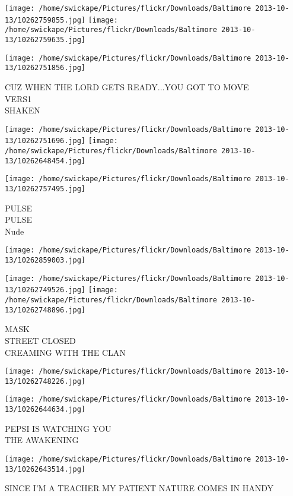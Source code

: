 \documentclass[10pt,letterpaper]{article}
\begin{document}
\texttt{[image: /home/swickape/Pictures/flickr/Downloads/Baltimore 2013-10-13/10262759855.jpg]}
\texttt{[image: /home/swickape/Pictures/flickr/Downloads/Baltimore 2013-10-13/10262759635.jpg]}

\vspace{0.25in}
\texttt{[image: /home/swickape/Pictures/flickr/Downloads/Baltimore 2013-10-13/10262751856.jpg]}

CUZ WHEN THE LORD GETS READY...YOU GOT TO MOVE\\
VERS1\\
SHAKEN\\
\pagebreak

\texttt{[image: /home/swickape/Pictures/flickr/Downloads/Baltimore 2013-10-13/10262751696.jpg]}
\texttt{[image: /home/swickape/Pictures/flickr/Downloads/Baltimore 2013-10-13/10262648454.jpg]}

\vspace{0.25in}
\texttt{[image: /home/swickape/Pictures/flickr/Downloads/Baltimore 2013-10-13/10262757495.jpg]}

PULSE\\
PULSE\\
Nude\\
\pagebreak

\texttt{[image: /home/swickape/Pictures/flickr/Downloads/Baltimore 2013-10-13/10262859003.jpg]}

\vspace{0.25in}
\texttt{[image: /home/swickape/Pictures/flickr/Downloads/Baltimore 2013-10-13/10262749526.jpg]}
\texttt{[image: /home/swickape/Pictures/flickr/Downloads/Baltimore 2013-10-13/10262748896.jpg]}

MASK\\
STREET CLOSED\\
CREAMING WITH THE CLAN\\
\pagebreak

\texttt{[image: /home/swickape/Pictures/flickr/Downloads/Baltimore 2013-10-13/10262748226.jpg]}

\vspace{0.25in}
\texttt{[image: /home/swickape/Pictures/flickr/Downloads/Baltimore 2013-10-13/10262644634.jpg]}

PEPSI IS WATCHING YOU\\
THE AWAKENING\\
\pagebreak

\texttt{[image: /home/swickape/Pictures/flickr/Downloads/Baltimore 2013-10-13/10262643514.jpg]}

SINCE I'M A TEACHER MY PATIENT NATURE COMES IN HANDY\\
\pagebreak
\end{document}
